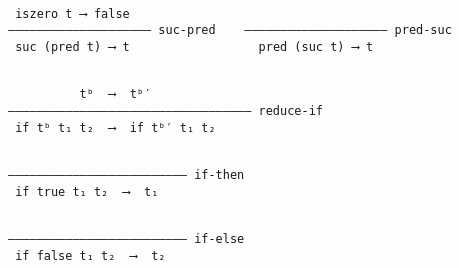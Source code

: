\documentclass[11pt]{article}
\theoremstyle{definition}
\begin{document}
\begin{verbatim}

 iszero t ⟶ false
–––––––––––––––––––– suc-pred    –––––––––––––––––––– pred-suc
 suc (pred t) ⟶ t                  pred (suc t) ⟶ t                                           

\end{verbatim}


\iffalse

\subsection{Semantics of natural numbers and booleans continued}
\label{sec:orgeedd2fd}

\fi

\begin{verbatim}

          tᵇ  ⟶  tᵇ′
–––––––––––––––––––––––––––––––––– reduce-if
 if tᵇ t₁ t₂  ⟶  if tᵇ′ t₁ t₂

\end{verbatim}

\begin{verbatim}

––––––––––––––––––––––––– if-then
 if true t₁ t₂  ⟶  t₁

\end{verbatim}

\begin{verbatim}

––––––––––––––––––––––––– if-else
 if false t₁ t₂  ⟶  t₂
\end{verbatim}
\end{document}
